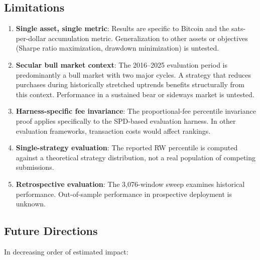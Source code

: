 \documentclass[11pt,letterpaper]{article}
\begin{document}
\subsection{Limitations}

\begin{enumerate}
  \item \textbf{Single asset, single metric}: Results are specific to Bitcoin and
    the sats-per-dollar accumulation metric.  Generalization to other assets or
    objectives (Sharpe ratio maximization, drawdown minimization) is untested.

  \item \textbf{Secular bull market context}: The 2016--2025 evaluation period is
    predominantly a bull market with two major cycles.  A strategy that reduces
    purchases during historically stretched uptrends benefits structurally from
    this context.  Performance in a sustained bear or sideways market is
    untested.

  \item \textbf{Harness-specific fee invariance}: The proportional-fee
    percentile invariance proof applies specifically to the SPD-based evaluation
    harness.  In other evaluation frameworks, transaction costs would affect
    rankings.

  \item \textbf{Single-strategy evaluation}: The reported RW percentile is
    computed against a theoretical strategy distribution, not a real population
    of competing submissions.

  \item \textbf{Retrospective evaluation}: The 3,076-window sweep examines
    historical performance.  Out-of-sample performance in prospective deployment
    is unknown.
\end{enumerate}

\subsection{Future Directions}

In decreasing order of estimated impact:
\end{document}
